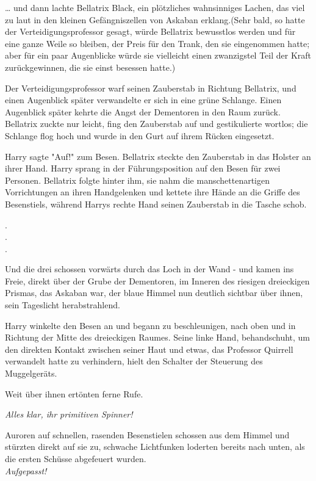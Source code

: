 {… und dann lachte Bellatrix Black, ein plötzliches wahnsinniges Lachen, das viel zu laut in den kleinen Gefängniszellen von Askaban erklang.(Sehr bald, so hatte der Verteidigungsprofessor gesagt, würde Bellatrix bewusstlos werden und für eine ganze Weile so bleiben, der Preis für den Trank, den sie eingenommen hatte; aber für ein paar Augenblicke würde sie vielleicht einen zwanzigstel Teil der Kraft zurückgewinnen, die sie einst besessen hatte.)

Der Verteidigungsprofessor warf seinen Zauberstab in Richtung Bellatrix, und einen Augenblick später verwandelte er sich in eine grüne Schlange. Einen Augenblick später kehrte die Angst der Dementoren in den Raum zurück. Bellatrix zuckte nur leicht, fing den Zauberstab auf und gestikulierte wortlos; die Schlange flog hoch und wurde in den Gurt auf ihrem Rücken eingesetzt.

Harry sagte "Auf!" zum Besen. Bellatrix steckte den Zauberstab in das Holster an ihrer Hand. Harry sprang in der Führungsposition auf den Besen für zwei Personen. Bellatrix folgte hinter ihm, sie nahm die manschettenartigen Vorrichtungen an ihren Handgelenken und kettete ihre Hände an die Griffe des Besenstiels, während Harrys rechte Hand seinen Zauberstab in die Tasche schob.

.\\ .\\ .

Und die drei schossen vorwärts durch das Loch in der Wand - und kamen ins Freie, direkt über der Grube der Dementoren, im Inneren des riesigen dreieckigen Prismas, das Askaban war, der blaue Himmel nun deutlich sichtbar über ihnen, sein Tageslicht herabstrahlend.

Harry winkelte den Besen an und begann zu beschleunigen, nach oben und in Richtung der Mitte des dreieckigen Raumes. Seine linke Hand, behandschuht, um den direkten Kontakt zwischen seiner Haut und etwas, das Professor Quirrell verwandelt hatte zu verhindern, hielt den Schalter der Steuerung des Muggelgeräts.

Weit über ihnen ertönten ferne Rufe.

\emph{Alles klar, ihr primitiven Spinner!}

Auroren auf schnellen, rasenden Besenstielen schossen aus dem Himmel und stürzten direkt auf sie zu, schwache Lichtfunken loderten bereits nach unten, als die ersten Schüsse abgefeuert wurden.\\

\emph{Aufgepasst!}

}
